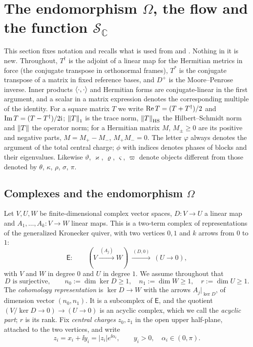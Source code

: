 \section{The endomorphism \texorpdfstring{$\Omega$}{Omega}, the flow and the function \texorpdfstring{$\mathcal S_{\mathbb C}$}{S}}\label{sec:setting}

This section fixes notation and recalls what is used from \cite{hkkp26} and
\cite{wue26}. Nothing in it is new. Throughout, $T^\dagger$ is the adjoint of
a linear map for the Hermitian metrics in force (the conjugate transpose in
orthonormal frames), $T^*$ is the conjugate transpose of a matrix in fixed
reference bases, and $D^+$ is the Moore--Penrose inverse. Inner products
$\left\langle\cdot,\cdot\right\rangle$ and Hermitian forms are conjugate-linear in the first
argument, and a scalar in a matrix expression denotes the corresponding
multiple of the identity. For a square matrix
$T$ we write
$\operatorname{Re} T=(T+T^\dagger)/2$ and $\operatorname{Im} T=(T-T^\dagger)/2\mathrm i$; $\left\lVert T\right\rVert_1$ is the
trace norm, $\left\lVert T\right\rVert_{\mathrm{HS}}$ the Hilbert--Schmidt norm and $\left\lVert T\right\rVert$ the
operator norm; for a Hermitian matrix $M$, $M_\pm\geq0$ are its positive and
negative parts, $M=M_+-M_-$, $M_+M_-=0$. The letter $\varphi$ always denotes
the argument of the total central charge; $\phi$ with indices denotes phases
of blocks and their eigenvalues. Likewise $\vartheta$, $\varkappa$,
$\varrho$, $\varsigma$, $\varpi$ denote objects different from those denoted
by $\theta$, $\kappa$, $\rho$, $\sigma$, $\pi$.

\subsection{Complexes and the endomorphism \texorpdfstring{$\Omega$}{Omega}}
Let $V,U,W$ be finite-dimensional complex vector spaces, $D:V\to U$ a linear
map and $A_1,\dots,A_k:V\to W$ linear maps. This is a two-term complex of
representations of the generalized Kronecker quiver, with two vertices $0,1$
and $k$ arrows from $0$ to $1$:
\begin{equation}\label{eq:complex}
 \mathsf E:\qquad(V\xrightarrow{\,(A_j)\,}W)\ \xrightarrow{\,(D,0)\,}\ (U\to0),
\end{equation}
with $V$ and $W$ in degree $0$ and $U$ in degree $1$. We assume throughout
that
\[
 D\text{ is surjective},\qquad n_0:=\dim\ker D\geq1,\quad n_1:=\dim W\geq1,
 \quad r:=\dim U\geq1 .
\]
The \emph{cohomology representation} is $\ker D\to W$ with the arrows
$A_j|_{\ker D}$, of dimension vector $(n_0,n_1)$. It is a subcomplex of
$\mathsf E$, and the quotient $(V/\ker D\to0)\to(U\to0)$ is an acyclic
complex, which we call the \emph{acyclic part}; $r$ is its rank. Fix
\emph{central charges} $z_0,z_1$ in the open upper half-plane, attached to
the two vertices, and write
\[
 z_i=x_i+\ii y_i=|z_i|e^{\ii\alpha_i},\qquad y_i>0,\quad\alpha_i\in(0,\pi).
\]

